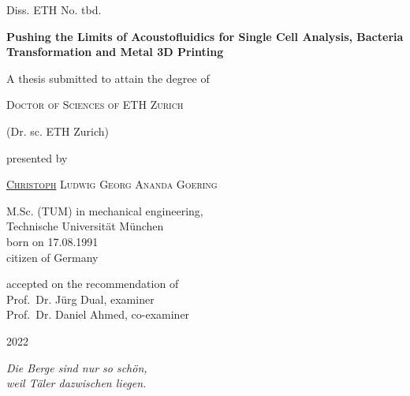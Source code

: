 \begin{titlepage}
{Diss. ETH No. tbd. \vspace{2.5cm}}
\begin{center}
\LARGE{\textbf{Pushing the Limits of Acoustofluidics for Single Cell Analysis, 
Bacteria Transformation and Metal 3D Printing}}
\end{center}
\vspace{2.0cm}
\begin{center}
{A thesis submitted to attain the degree of}
\end{center}
\begin{center}
{\textsc{Doctor of Sciences of ETH Zurich}}
\end{center}
\begin{center}
{(Dr. sc. ETH Zurich)} \end{center}
\vspace{2.0cm}
\begin{center}
{presented by}
\end{center}
\begin{center}
  {\textsc{\underline{Christoph} Ludwig Georg Ananda Goering}}
\end{center}
\begin{center}
{M.Sc. (TUM) in mechanical engineering,\\
Technische Universit\"at M\"unchen\\
born on 17.08.1991 \\
citizen of Germany}
\end{center}
\vspace{1cm}
\begin{center}
{accepted on the recommendation of \\ \vspace{0.3cm}
Prof.\ Dr. J\"urg Dual, examiner \\
Prof.\ Dr. Daniel Ahmed, co-examiner}
\end{center}
\vspace{1cm}
\begin{center}
2022
\end{center}

\cleardoublepage
\thispagestyle{empty}
\vspace*{5.0cm}

\begin{center}
\vspace*{0.5cm}
\Large
\textit{Die Berge sind nur so schön,\\ weil Täler dazwischen liegen.}


\end{center}
\end{titlepage}
